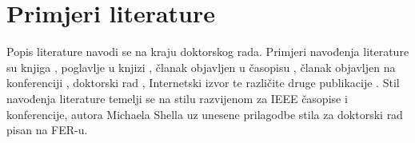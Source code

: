 \begin{landscape}
\begin{table}
\begin{minipage}{\linewidth}
\begin{tabularx} {\linewidth}{l C C C C C C C C C C C C}
      \end{tabularx} 
      \label{tab:mean_mias}
      \setcounter{footnote}{\value{mpfootnote}}
    \end{minipage}
  \end{table}
\end{landscape}


\section{Primjeri literature}


Popis literature navodi se na kraju doktorskog rada. Primjeri navođenja
literature su knjiga \cite{Hajn01}, poglavlje u knjizi \cite{Samp05}, članak
objavljen u časopisu \cite{Sim03}, članak objavljen na konferenciji
\cite{Wirt99}, doktorski rad \cite{Will93}, Internetski izvor \cite{Jone12} te
različite druge publikacije \cite{Rsoft}. Stil navođenja literature temelji se
na stilu razvijenom za IEEE časopise i konferencije, autora Michaela Shella uz
unesene prilagodbe stila za doktorski rad pisan na FER-u.
